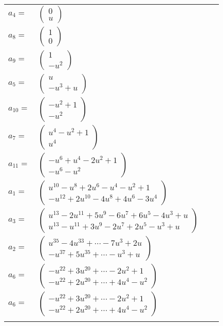 \documentclass[1p]{elsarticle_modified}
\theoremstyle{definition}
\begin{document}
\begin{tabular}{m{7pt} m{180pt} m{7pt} m{180pt} }
\flushright $a_{4}=$&$\begin{pmatrix}0\\u\end{pmatrix}$ \\
\flushright $a_{8}=$&$\begin{pmatrix}1\\0\end{pmatrix}$ \\
\flushright $a_{9}=$&$\begin{pmatrix}1\\- u^2\end{pmatrix}$ \\
\flushright $a_{5}=$&$\begin{pmatrix}u\\- u^3+u\end{pmatrix}$ \\
\flushright $a_{10}=$&$\begin{pmatrix}- u^2+1\\- u^2\end{pmatrix}$ \\
\flushright $a_{7}=$&$\begin{pmatrix}u^4- u^2+1\\u^4\end{pmatrix}$ \\
\flushright $a_{11}=$&$\begin{pmatrix}- u^6+u^4-2 u^2+1\\- u^6- u^2\end{pmatrix}$ \\
\flushright $a_{1}=$&$\begin{pmatrix}u^{10}- u^8+2 u^6- u^4- u^2+1\\- u^{12}+2 u^{10}-4 u^8+4 u^6-3 u^4\end{pmatrix}$ \\
\flushright $a_{3}=$&$\begin{pmatrix}u^{13}-2 u^{11}+5 u^9-6 u^7+6 u^5-4 u^3+u\\u^{13}- u^{11}+3 u^9-2 u^7+2 u^5- u^3+u\end{pmatrix}$ \\
\flushright $a_{2}=$&$\begin{pmatrix}u^{35}-4 u^{33}+\cdots-7 u^3+2 u\\- u^{37}+5 u^{35}+\cdots- u^3+u\end{pmatrix}$ \\
\flushright $a_{6}=$&$\begin{pmatrix}- u^{22}+3 u^{20}+\cdots-2 u^2+1\\- u^{22}+2 u^{20}+\cdots+4 u^4- u^2\end{pmatrix}$\\ \flushright $a_{6}=$&$\begin{pmatrix}- u^{22}+3 u^{20}+\cdots-2 u^2+1\\- u^{22}+2 u^{20}+\cdots+4 u^4- u^2\end{pmatrix}$\\&\end{tabular}
\end{document}
